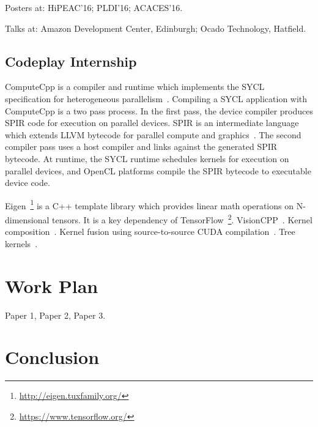 Posters at: HiPEAC'16; PLDI'16; ACACES'16.

Talks at: Amazon Development Center, Edinburgh; Ocado Technology,
Hatfield.


\subsection{Codeplay Internship}

ComputeCpp is a compiler and runtime which implements the SYCL
specification for heterogeneous
parallelism~\cite{Rovatsou2015}. Compiling a SYCL application with
ComputeCpp is a two pass process. In the first pass, the device
compiler produces SPIR code for execution on parallel devices. SPIR is
an intermediate language which extends LLVM bytecode for parallel
compute and graphics~\cite{Portable2014}. The second compiler pass
uses a host compiler and links against the generated SPIR bytecode. At
runtime, the SYCL runtime schedules kernels for execution on parallel
devices, and OpenCL platforms compile the SPIR bytecode to executable
device code.

Eigen~\footnote{\url{http://eigen.tuxfamily.org/}} is a C++ template
library which provides linear math operations on N-dimensional
tensors. It is a key dependency of
TensorFlow~\footnote{\url{https://www.tensorflow.org/}}. VisionCPP~\cite{Goli2016a}. Kernel
composition~\cite{Potter2015}. Kernel fusion using source-to-source
CUDA compilation~\cite{Fousek2011}. Tree kernels~\cite{Annesi2014}.

\section{Work Plan}

Paper 1, Paper 2, Paper 3.


\section{Conclusion}


\newpage
\label{bibliography}
\printbibliography




